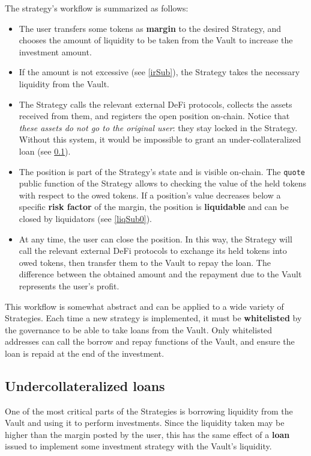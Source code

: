 \documentclass[a4paper,10 pt]{article}
\theoremstyle{definition}
\begin{document}
The strategy's workflow is summarized as follows:
\begin{itemize}
\item The user transfers some tokens as {\bf margin} to the desired Strategy, and chooses the amount of liquidity to be taken from the Vault to increase the investment amount.
\item If the amount is not excessive (see \ref{irSub}), the Strategy takes the necessary liquidity from the Vault.
\item The Strategy calls the relevant external DeFi protocols, collects the assets received from them, and registers the open position on-chain. Notice that {\it these assets do not go to the original user}: they stay locked in the Strategy. Without this system, it would be impossible to grant an under-collateralized loan (see \ref{ulSub}).
\item The position is part of the Strategy's state and is visible on-chain. The \verb|quote| public function of the Strategy allows to checking the value of the held tokens with respect to the owed tokens. If a position's value decreases below a specific {\bf risk factor} of the margin, the position is {\bf liquidable} and can be closed by liquidators (see \ref{liqSub0}).
\item At any time, the user can close the position. In this way, the Strategy will call the relevant external DeFi protocols to exchange its held tokens into owed tokens, then transfer them to the Vault to repay the loan. The difference between the obtained amount and the repayment due to the Vault represents the user's profit.
\end{itemize} 

This workflow is somewhat abstract and can be applied to a wide variety of Strategies. Each time a new strategy is implemented, it must be {\bf whitelisted} by the governance to be able to take loans from the Vault.
Only whitelisted addresses can call the borrow and repay functions of the Vault, and ensure the loan is repaid at the end of the investment.

\subsection{Undercollateralized loans}\label{ulSub}

One of the most critical parts of the Strategies is borrowing liquidity from the Vault and using it to perform investments. Since the liquidity taken may be higher than the margin posted by the user, this has the same effect of a {\bf loan} issued to implement some investment strategy with the Vault's liquidity.
\end{document}
